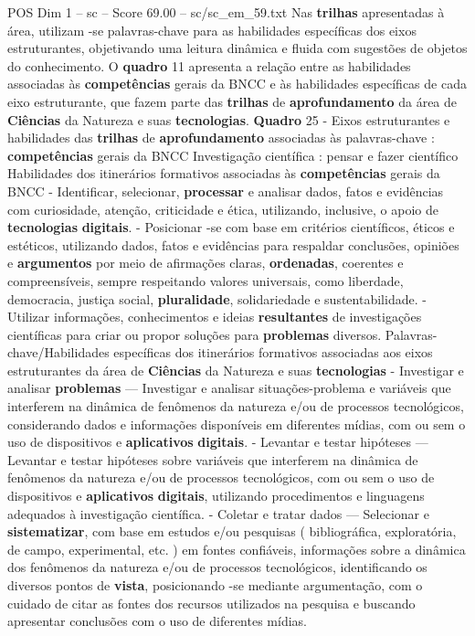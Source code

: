 \begin{textsample}{POS Dim 1 – sc – Score 69.00 – sc/sc\_em\_59.txt}
Nas \textbf{trilhas} apresentadas à área, utilizam -se palavras-chave para as habilidades específicas dos eixos estruturantes, objetivando uma leitura dinâmica e fluida com sugestões de objetos do conhecimento.
O \textbf{quadro} 11 apresenta a relação entre as habilidades associadas às \textbf{competências} gerais da BNCC e às habilidades específicas de cada eixo estruturante, que fazem parte das \textbf{trilhas} de \textbf{aprofundamento} da área de \textbf{Ciências} da Natureza e suas \textbf{tecnologias}. \textbf{Quadro} 25 - Eixos estruturantes e habilidades das \textbf{trilhas} de \textbf{aprofundamento} associadas às palavras-chave : \textbf{competências} gerais da BNCC Investigação científica : pensar e fazer científico Habilidades dos itinerários formativos associadas às \textbf{competências} gerais da BNCC - Identificar, selecionar, \textbf{processar} e analisar dados, fatos e evidências com curiosidade, atenção, criticidade e ética, utilizando, inclusive, o apoio de \textbf{tecnologias} \textbf{digitais}. - Posicionar -se com base em critérios científicos, éticos e estéticos, utilizando dados, fatos e evidências para respaldar conclusões, opiniões e \textbf{argumentos} por meio de afirmações claras, \textbf{ordenadas}, coerentes e compreensíveis, sempre respeitando valores universais, como liberdade, democracia, justiça social, \textbf{pluralidade}, solidariedade e sustentabilidade. - Utilizar informações, conhecimentos e ideias \textbf{resultantes} de investigações científicas para criar ou propor soluções para \textbf{problemas} diversos.
Palavras-chave/Habilidades específicas dos itinerários formativos associadas aos eixos estruturantes da área de \textbf{Ciências} da Natureza e suas \textbf{tecnologias} - Investigar e analisar \textbf{problemas} — Investigar e analisar situações-problema e variáveis que interferem na dinâmica de fenômenos da natureza e/ou de processos tecnológicos, considerando dados e informações disponíveis em diferentes mídias, com ou sem o uso de dispositivos e \textbf{aplicativos} \textbf{digitais}. - Levantar e testar hipóteses — Levantar e testar hipóteses sobre variáveis que interferem na dinâmica de fenômenos da natureza e/ou de processos tecnológicos, com ou sem o uso de dispositivos e \textbf{aplicativos} \textbf{digitais}, utilizando procedimentos e linguagens adequados à investigação científica. - Coletar e tratar dados — Selecionar e \textbf{sistematizar}, com base em estudos e/ou pesquisas ( bibliográfica, exploratória, de campo, experimental, etc. ) em fontes confiáveis, informações sobre a dinâmica dos fenômenos da natureza e/ou de processos tecnológicos, identificando os diversos pontos de \textbf{vista}, posicionando -se mediante argumentação, com o cuidado de citar as fontes dos recursos utilizados na pesquisa e buscando apresentar conclusões com o uso de diferentes mídias.

\end{textsample}
